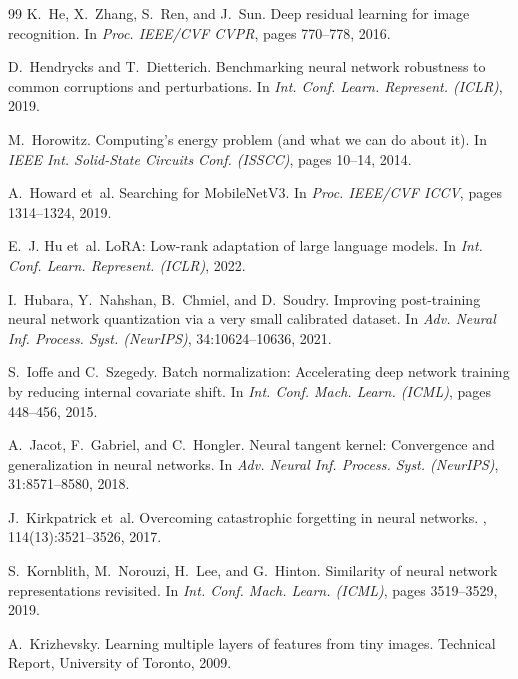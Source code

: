 \documentclass{article}
\begin{document}
\begin{thebibliography}{99}
K.~He, X.~Zhang, S.~Ren, and J.~Sun.
\newblock Deep residual learning for image recognition.
\newblock In {\em Proc. IEEE/CVF CVPR}, pages 770--778, 2016.

D.~Hendrycks and T.~Dietterich.
\newblock Benchmarking neural network robustness to common corruptions and perturbations.
\newblock In {\em Int. Conf. Learn. Represent. (ICLR)}, 2019.

M.~Horowitz.
 Computing's energy problem (and what we can do about it).
\newblock In {\em IEEE Int. Solid-State Circuits Conf. (ISSCC)}, pages 10--14, 2014.

A.~Howard et~al.
\newblock Searching for {MobileNetV3}.
\newblock In {\em Proc. IEEE/CVF ICCV}, pages 1314--1324, 2019.

E.~J. Hu et~al.
\newblock Lo{RA}: Low-rank adaptation of large language models.
\newblock In {\em Int. Conf. Learn. Represent. (ICLR)}, 2022.

I.~Hubara, Y.~Nahshan, B.~Chmiel, and D.~Soudry.
\newblock Improving post-training neural network quantization via a very small calibrated dataset.
\newblock In {\em Adv. Neural Inf. Process. Syst. (NeurIPS)}, 34:10624--10636, 2021.

S.~Ioffe and C.~Szegedy.
\newblock Batch normalization: Accelerating deep network training by reducing internal covariate shift.
\newblock In {\em Int. Conf. Mach. Learn. (ICML)}, pages 448--456, 2015.

A.~Jacot, F.~Gabriel, and C.~Hongler.
\newblock Neural tangent kernel: Convergence and generalization in neural networks.
\newblock In {\em Adv. Neural Inf. Process. Syst. (NeurIPS)}, 31:8571--8580, 2018.

J.~Kirkpatrick et~al.
\newblock Overcoming catastrophic forgetting in neural networks.
, 114(13):3521--3526, 2017.

S.~Kornblith, M.~Norouzi, H.~Lee, and G.~Hinton.
\newblock Similarity of neural network representations revisited.
\newblock In {\em Int. Conf. Mach. Learn. (ICML)}, pages 3519--3529, 2019.

A.~Krizhevsky.
\newblock Learning multiple layers of features from tiny images.
\newblock Technical Report, University of Toronto, 2009.


\end{thebibliography}
\end{document}
